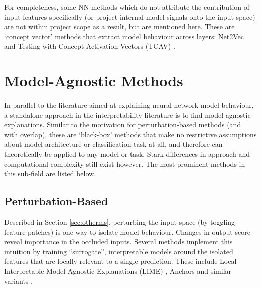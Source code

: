 \documentclass[main]{subfiles}
\begin{document}





For completeness, some NN methods which do not attribute the contribution of input features specifically (or project internal model signals onto the input space) are not within project scope as a result, but are mentioned here. These are `concept vector' methods that extract model behaviour across layers: Net2Vec \cite{net2vec} and Testing with Concept Activation Vectors (TCAV) \cite{tcav}.





\section{Model-Agnostic Methods}

In parallel to the literature aimed at explaining neural network model behaviour, a standalone approach in the interpretability literature is to find model-agnostic explanations. Similar to the motivation for perturbation-based methods (and with overlap), these are `black-box' methods that make no restrictive assumptions about model architecture or classification task at all, and therefore can theoretically be applied to any model or task. Stark differences in approach and computational complexity still exist however. The most prominent methods in this sub-field are listed below.


\subsection{Perturbation-Based}
Described in Section \ref{sec:otherms}, perturbing the input space (by toggling feature patches) is one way to isolate model behaviour. Changes in output score reveal importance in the occluded inputs. Several methods implement this intuition by training ``surrogate'', interpretable models around the isolated features that are locally relevant to a single prediction. These include Local Interpretable Model-Agnostic Explanations (LIME) \cite{lime}, Anchors \cite{anchors} and similar variants \cite{local}.
\end{document}
